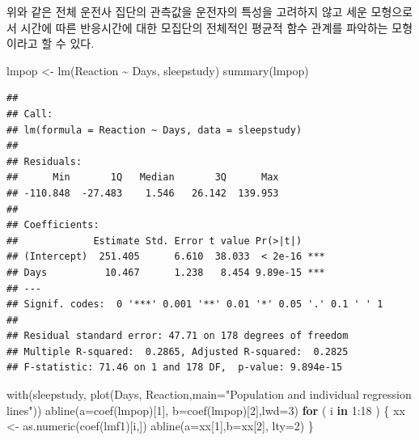 \documentclass[
]{book}
\newenvironment{Shaded}{\begin{snugshade}}{\end{snugshade}}
\newcommand{\AttributeTok}[1]{\textcolor[rgb]{0.77,0.63,0.00}{#1}}
\newcommand{\ControlFlowTok}[1]{\textcolor[rgb]{0.13,0.29,0.53}{\textbf{#1}}}
\newcommand{\DecValTok}[1]{\textcolor[rgb]{0.00,0.00,0.81}{#1}}
\newcommand{\FunctionTok}[1]{\textcolor[rgb]{0.00,0.00,0.00}{#1}}
\newcommand{\NormalTok}[1]{#1}
\newcommand{\OtherTok}[1]{\textcolor[rgb]{0.56,0.35,0.01}{#1}}
\newcommand{\SpecialCharTok}[1]{\textcolor[rgb]{0.00,0.00,0.00}{#1}}
\newcommand{\StringTok}[1]{\textcolor[rgb]{0.31,0.60,0.02}{#1}}
\theoremstyle{definition}
\theoremstyle{definition}
\theoremstyle{definition}
\theoremstyle{remark}
\begin{document}
위와 같은 전체 운전사 집단의 관측값을 운전자의 특성을 고려하지 않고 세운 모형으로서 시간에 따른 반응시간에 대한 모집단의 전체적인 평균적 함수 관계를 파악하는 모형이라고 할 수 있다.

\begin{Shaded}
\begin{Highlighting}[]
\NormalTok{lmpop }\OtherTok{\textless{}{-}} \FunctionTok{lm}\NormalTok{(Reaction }\SpecialCharTok{\textasciitilde{}}\NormalTok{ Days, sleepstudy)}
\FunctionTok{summary}\NormalTok{(lmpop)}
\end{Highlighting}
\end{Shaded}

\begin{verbatim}
## 
## Call:
## lm(formula = Reaction ~ Days, data = sleepstudy)
## 
## Residuals:
##      Min       1Q   Median       3Q      Max 
## -110.848  -27.483    1.546   26.142  139.953 
## 
## Coefficients:
##             Estimate Std. Error t value Pr(>|t|)    
## (Intercept)  251.405      6.610  38.033  < 2e-16 ***
## Days          10.467      1.238   8.454 9.89e-15 ***
## ---
## Signif. codes:  0 '***' 0.001 '**' 0.01 '*' 0.05 '.' 0.1 ' ' 1
## 
## Residual standard error: 47.71 on 178 degrees of freedom
## Multiple R-squared:  0.2865, Adjusted R-squared:  0.2825 
## F-statistic: 71.46 on 1 and 178 DF,  p-value: 9.894e-15
\end{verbatim}

\begin{Shaded}
\begin{Highlighting}[]
\FunctionTok{with}\NormalTok{(sleepstudy, }\FunctionTok{plot}\NormalTok{(Days, Reaction,}\AttributeTok{main=}\StringTok{"Population and individual regression lines"}\NormalTok{))}
\FunctionTok{abline}\NormalTok{(}\AttributeTok{a=}\FunctionTok{coef}\NormalTok{(lmpop)[}\DecValTok{1}\NormalTok{], }\AttributeTok{b=}\FunctionTok{coef}\NormalTok{(lmpop)[}\DecValTok{2}\NormalTok{],}\AttributeTok{lwd=}\DecValTok{3}\NormalTok{)}
\ControlFlowTok{for}\NormalTok{ ( i }\ControlFlowTok{in} \DecValTok{1}\SpecialCharTok{:}\DecValTok{18}\NormalTok{ ) \{}
\NormalTok{  xx }\OtherTok{\textless{}{-}} \FunctionTok{as.numeric}\NormalTok{(}\FunctionTok{coef}\NormalTok{(lmf1)[i,])}
\FunctionTok{abline}\NormalTok{(}\AttributeTok{a=}\NormalTok{xx[}\DecValTok{1}\NormalTok{],}\AttributeTok{b=}\NormalTok{xx[}\DecValTok{2}\NormalTok{], }\AttributeTok{lty=}\DecValTok{2}\NormalTok{)}
\NormalTok{\}}
\end{Highlighting}
\end{Shaded}
\end{document}
